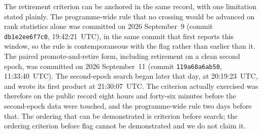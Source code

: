 
The retirement criterion can be anchored in the same record, with one limitation
stated plainly. The programme-wide rule that no crossing would be advanced on
rank statistics alone was committed on 2026 September~9 (commit
\texttt{db1e2ee6f7c0}, 19:42:21~UTC), in the same commit that first reports this
window, so the rule is contemporaneous with the flag rather than earlier than it.
The paired promote-and-retire form, including retirement on a clean second epoch,
was committed on 2026 September~11 (commit \texttt{119a68a6ab50}, 11:33:40~UTC).
The second-epoch search began later that day, at 20:19:23~UTC, and wrote its
first product at 21:30:07~UTC. The criterion actually exercised was therefore on
the public record eight hours and forty-six minutes before the second-epoch data
were touched, and the programme-wide rule two days before that. The ordering that
can be demonstrated is criterion before search; the ordering criterion before
flag cannot be demonstrated and we do not claim it.

